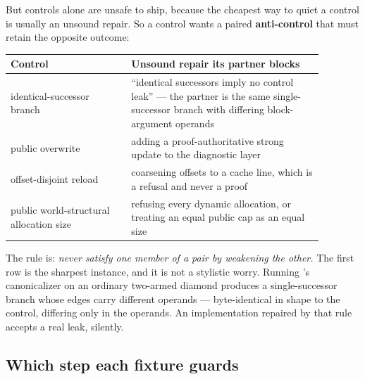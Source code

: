 But controls alone are unsafe to ship, because the cheapest way to quiet a
control is usually an unsound repair. So a control wants a paired
\textbf{anti-control} that must retain the opposite outcome:

\begin{center}
\begin{tabular}{@{}p{0.34\linewidth} p{0.54\linewidth}@{}}
\toprule
Control & Unsound repair its partner blocks \\
\midrule
identical-successor branch
  & ``identical successors imply no control leak'' --- the partner is the same
    single-successor branch with differing block-argument operands \\[3pt]
public overwrite
  & adding a proof-authoritative strong update to the diagnostic layer \\[3pt]
offset-disjoint reload
  & coarsening offsets to a cache line, which is a refusal and never a proof \\[3pt]
public world-structural allocation size
  & refusing every dynamic allocation, or treating an equal public cap as an
    equal size \\
\bottomrule
\end{tabular}
\end{center}

The rule is: \emph{never satisfy one member of a pair by weakening the other.}
The first row is the sharpest instance, and it is not a stylistic worry. Running
's canonicalizer on an ordinary two-armed diamond produces a
single-successor branch whose edges carry different operands --- byte-identical in
shape to the control, differing only in the operands. An implementation repaired
by that rule accepts a real leak, silently.

\subsection{Which step each fixture guards}

